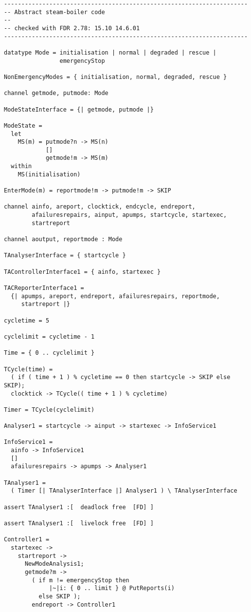 \documentclass{report}
\begin{document}
\begin{verbatim}
----------------------------------------------------------------------
-- Abstract steam-boiler code
--
-- checked with FDR 2.78: 15.10 14.6.01
----------------------------------------------------------------------

datatype Mode = initialisation | normal | degraded | rescue |
                emergencyStop

NonEmergencyModes = { initialisation, normal, degraded, rescue }

channel getmode, putmode: Mode

ModeStateInterface = {| getmode, putmode |}

ModeState =
  let
    MS(m) = putmode?n -> MS(n)
            []
            getmode!m -> MS(m)
  within
    MS(initialisation)

EnterMode(m) = reportmode!m -> putmode!m -> SKIP

channel ainfo, areport, clocktick, endcycle, endreport,
        afailuresrepairs, ainput, apumps, startcycle, startexec,
        startreport

channel aoutput, reportmode : Mode

TAnalyserInterface = { startcycle }

TAControllerInterface1 = { ainfo, startexec }

TACReporterInterface1 =
  {| apumps, areport, endreport, afailuresrepairs, reportmode,
     startreport |}

cycletime = 5

cyclelimit = cycletime - 1

Time = { 0 .. cyclelimit }

TCycle(time) =
  ( if ( time + 1 ) % cycletime == 0 then startcycle -> SKIP else SKIP);
  clocktick -> TCycle(( time + 1 ) % cycletime)

Timer = TCycle(cyclelimit)

Analyser1 = startcycle -> ainput -> startexec -> InfoService1

InfoService1 =
  ainfo -> InfoService1
  []
  afailuresrepairs -> apumps -> Analyser1

TAnalyser1 =
  ( Timer [| TAnalyserInterface |] Analyser1 ) \ TAnalyserInterface

assert TAnalyser1 :[  deadlock free  [FD] ]

assert TAnalyser1 :[  livelock free  [FD] ]

Controller1 =
  startexec ->
    startreport ->
      NewModeAnalysis1;
      getmode?m ->
        ( if m != emergencyStop then
             |~|i: { 0 .. limit } @ PutReports(i)
          else SKIP );
        endreport -> Controller1


\end{verbatim}
\end{document}
